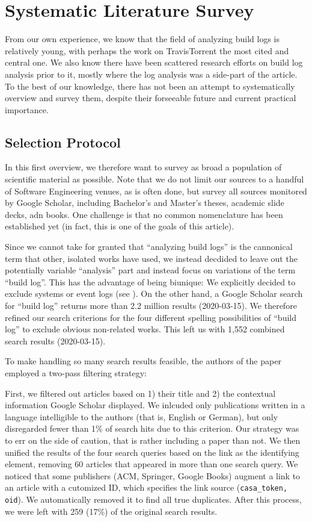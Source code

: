 \section{Systematic Literature Survey}
\label{sec:survey}
From our own experience, we know that the field of analyzing build
logs is relatively young, with perhaps the work on TravisTorrent the
most cited and central one. We also know there have been scattered
research efforts on build log analysis prior to it, mostly where the
log analysis was a side-part of the article. To the best of our
knowledge, there has not been an attempt to systematically overview
and survey them, despite their forseeable future and current practical
importance.


\subsection{Selection Protocol}
In this first overview, we therefore want to survey as broad a
population of scientific material as possible. Note that we do not
limit our sources to a handful of Software Engineering venues, as is
often done, but survey all sources monitored by Google Scholar,
including Bachelor's and Master's theses, academic slide decks, adn
books. One challenge is that no common nomenclature has been
established yet (in fact, this is one of the goals of this article).

Since we cannot take for granted that ``analyzing build logs'' is the
cannonical term that other, isolated works have used, we instead
decdided to leave out the potentially variable ``analysis'' part and
instead focus on variations of the term ``build log''. This has the
advantage of being biunique: We explicitly decided to exclude systems
or event logs (see ). On the other hand, a Google Scholar
search for ``build log'' returns more than 2.2 million results
(2020-03-15). We therefore refined our search criterions for the four
different spelling possibilities of ``build log'' to exclude obvious
non-related works. This left us with 1,552 combined search results
(2020-03-15).

To make handling so many search results feasible, the authors of the
paper employed a two-pass filtering strategy:

First, we filtered out articles based on 1) their title and 2) the
contextual information Google Scholar displayed. We inlcuded only
publications written in a language intelligible to the authors (that
is, English or German), but only disregarded fewer than 1\% of search
hits due to this criterion. Our strategy was to err on the side of
caution, that is rather including a paper than not. We then unified
the results of the four search queries based on the link as the
identifying element, removing 60 articles that appeared in more than
one search query. We noticed that some publishers (ACM, Springer,
Google Books) augment a link to an article with a cutomized ID, which
specifies the link source ({\tt casa\_token, oid}). We automatically
removed it to find all true duplicates. After this process, we were
left with 259 (17\%) of the original search results.


